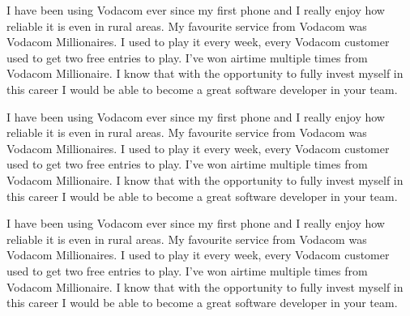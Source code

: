 \documentclass[11pt,a4paper,roman]{moderncv}        %
\begin{document}
I have been using Vodacom ever since my first phone and I really enjoy how
reliable it is even in rural areas. My favourite service from Vodacom was
Vodacom Millionaires. I used to play it every week,  every Vodacom customer
used to get two free entries to play.  I've won airtime multiple times from
Vodacom Millionaire.
I know that with the opportunity to fully invest myself in this career I would
be able to become a great software developer in your team.

I have been using Vodacom ever since my first phone and I really enjoy how
reliable it is even in rural areas. My favourite service from Vodacom was
Vodacom Millionaires. I used to play it every week,  every Vodacom customer
used to get two free entries to play.  I've won airtime multiple times from
Vodacom Millionaire.
I know that with the opportunity to fully invest myself in this career I would
be able to become a great software developer in your team.


I have been using Vodacom ever since my first phone and I really enjoy how
reliable it is even in rural areas. My favourite service from Vodacom was
Vodacom Millionaires. I used to play it every week,  every Vodacom customer
used to get two free entries to play.  I've won airtime multiple times from
Vodacom Millionaire.
I know that with the opportunity to fully invest myself in this career I would
be able to become a great software developer in your team.






\makeletterclosing
\end{document}
